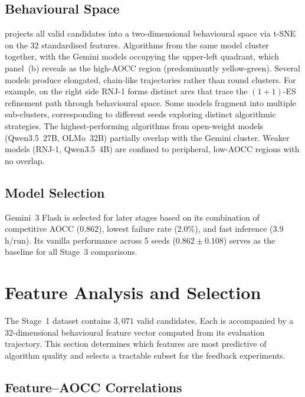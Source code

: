 \subsection{Behavioural Space}
\label{sec:results-behavioural-space}


 projects all valid candidates into a two-dimensional behavioural space via t-SNE on the 32 standardised features. Algorithms from the same model cluster together, with the Gemini models occupying the upper-left quadrant, which panel~(b) reveals as the high-AOCC region (predominantly yellow-green). Several models produce elongated, chain-like trajectories rather than round clusters. For example, on the right side RNJ-1 forms distinct arcs that trace the $(1+1)$-ES refinement path through behavioural space. Some models fragment into multiple sub-clusters, corresponding to different seeds exploring distinct algorithmic strategies. The highest-performing algorithms from open-weight models (Qwen3.5~27B, OLMo~32B) partially overlap with the Gemini cluster. Weaker models (RNJ-1, Qwen3.5~4B) are confined to peripheral, low-AOCC regions with no overlap.

\subsection{Model Selection}
\label{sec:results-model-selection}


Gemini~3 Flash is selected for later stages based on its combination of competitive AOCC ($0.862$), lowest failure rate ($2.0\%$), and fast inference ($3.9$\,h/run). Its vanilla performance across 5 seeds ($0.862 \pm 0.108$) serves as the baseline for all Stage~3 comparisons.

\section{Feature Analysis and Selection}
\label{sec:results-features}

The Stage~1 dataset contains $3{,}071$ valid candidates. Each is accompanied by a 32-dimensional behavioural feature vector computed from its evaluation trajectory. This section determines which features are most predictive of algorithm quality and selects a tractable subset for the feedback experiments.

\subsection{Feature--AOCC Correlations}
\label{sec:results-correlations}

